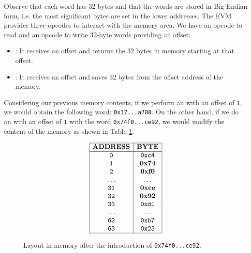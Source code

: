 Observe that each word has 32 bytes and that the words are stored in Big-Endian form, i.e. the most significant bytes are set in the lower addresses. The EVM provides three opcodes to interact with the memory area. We have an opcode to read and an opcode to write 32-byte words providing an offset:

\begin{itemize}
    
    \item \MLOAD: It receives an offset and returns the 32 bytes in memory starting at that offset.
    
    \item \MSTORE: It receives an offset and saves 32 bytes from the offset address of the memory.
    
\end{itemize}

Considering our previous memory contents, if we perform an \MLOAD with an offset of \texttt{1}, we would obtain the following word: \texttt{0x17...a788}. On the other hand, if we do an \MSTORE with an offset of \texttt{1} with the word \texttt{0x74f0...ce92}, we would modify the content of the memory as shown in Table \ref{tab:second-example}. 

\begin{figure}[h!]
    \[
    \begin{array}{|c|c|}
        \hline
        \mathbf{ADDRESS} &\mathbf{BYTE} \\ \hline
        \mathtt{0} &\mathtt{0xc4} \\
        \mathtt{1} &\mathtt{\textbf{0x74}} \\
        \mathtt{2} &\mathtt{\textbf{0xf0}} \\
        \mathtt{\ldots} &\mathtt{\ldots} \\
        \mathtt{31} &\mathtt{\textbf{0xce}} \\
        \mathtt{32} &\mathtt{\textbf{0x92}} \\
        \mathtt{33} &\mathtt{0xd1} \\
        \mathtt{\ldots} &\mathtt{\ldots} \\
        \mathtt{62} &\mathtt{0xb7} \\
        \mathtt{63} &\mathtt{0x23} \\
        \hline
    \end{array}
    \]
    \caption{Layout in memory after the introduction of \texttt{0x74f0...ce92}.}
    \label{tab:second-example}
\end{figure}

